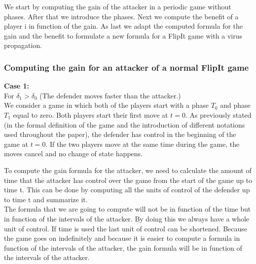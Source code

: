  
%
%


We  start by computing the gain of the attacker in a periodic game without phases. After that we introduce the phases. Next we compute the benefit of a player i in function of the gain. As last we adapt the computed formula for the gain and the benefit to formulate a new formula for a FlipIt game with a virus propagation. 
\\
\subsubsection{Computing the gain for an attacker of a normal FlipIt game}
\textbf{Case  1:} \\
For $\delta_{1} > \delta_{0}$ (The defender moves faster than the attacker.) \\

We consider a game in which both of the players start with a phase $T_{0}$ and phase $T_{1}$ equal to zero. Both players start their first move at $t=0$. As previously stated (in the formal definition of the game and the introduction of different notations used throughout the paper), the defender has control in the beginning of the game at $t=0$. If the two players move at the same time during the game, the moves cancel and no change of state happens. \\ 

To compute the gain formula for the attacker, we need to calculate the amount of time that the attacker has control over the game from the start of the game up to time t. This can be done by computing all the units of control of the defender up to time t  and summarize it. \\
The formula that we are going to compute will not be in function of the time but in function of the intervals of the attacker. By doing this we always have a whole unit of control. If time is used the last unit of control can be shortened. Because the game goes on indefinitely and because it is easier to compute a formula in function of the intervals of the attacker, the gain formula will be in function of the intervals of the attacker. 

